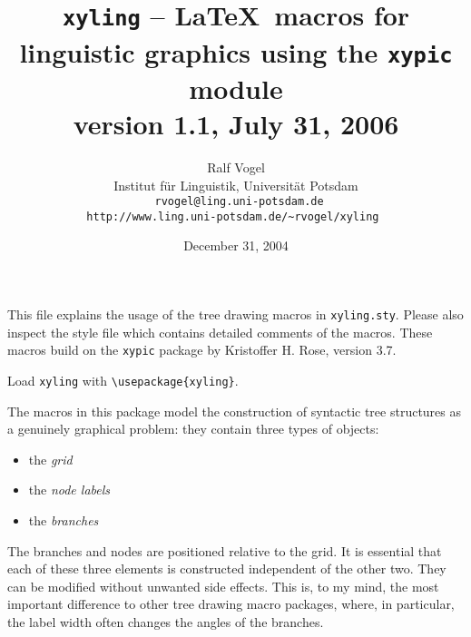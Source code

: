\documentclass[12pt,a4paper]{article}
\title{\texttt{xyling} -- \LaTeX\ macros for linguistic graphics using the
  \texttt{xypic} module\\ version 1.1, July 31, 2006}
\author{Ralf Vogel\\Institut f\"ur Linguistik, Universit\"at Potsdam\\\tt
  rvogel@ling.uni-potsdam.de\\\tt http://www.ling.uni-potsdam.de/\~{}rvogel/xyling
} \date{December 31, 2004}
\begin{document}
\maketitle

This file explains the usage of the tree drawing macros in
\texttt{xyling.sty}. Please also inspect the style file which contains detailed
comments of the macros. These macros build on the \texttt{xypic} package by
Kristoffer H. Rose, version 3.7. 

 
Load \texttt{xyling} with \verb|\usepackage{xyling}|.

The macros in this package model the construction of syntactic tree structures
as a genuinely graphical problem: they contain three types of objects:

\begin{itemize}
\item the \emph{grid}
\item the \emph{node labels}
\item the \emph{branches}
\end{itemize}

The branches and nodes are positioned relative to the grid. It is
essential that each of these three elements is constructed independent of the
other two. They can be modified without unwanted side effects. This
is, to my mind, the most important difference to other tree drawing macro
packages, where, in particular, the label width often changes the angles of the
branches. 
\end{document}
